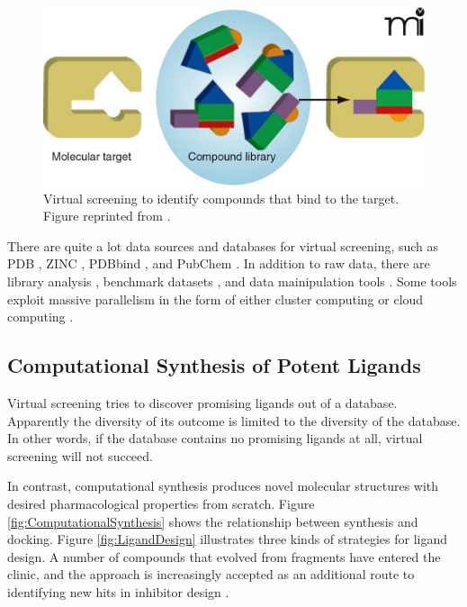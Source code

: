 \begin{figure}
\centering
\includegraphics[width=\textwidth]{Figures/VirtualScreening.png}
\caption{Virtual screening to identify compounds that bind to the target. Figure reprinted from \citep{470}.}
\label{fig:VirtualScreening}
\end{figure}

There are quite a lot data sources and databases for virtual screening, such as PDB \citep{540,539,537,105,538}, ZINC \citep{532}, PDBbind \citep{529,530}, and PubChem \citep{526}. In addition to raw data, there are library analysis \citep{521}, benchmark datasets \citep{534,533,535,536}, and data mainipulation tools \citep{542}. Some tools exploit massive parallelism in the form of either cluster computing or cloud computing \citep{557,773,560,782}.

\subsection{Computational Synthesis of Potent Ligands}

Virtual screening tries to discover promising ligands out of a database. Apparently the diversity of its outcome is limited to the diversity of the database. In other words, if the database contains no promising ligands at all, virtual screening will not succeed.

In contrast, computational synthesis produces novel molecular structures with desired pharmacological properties from scratch. Figure \ref{fig:ComputationalSynthesis} shows the relationship between synthesis and docking. Figure \ref{fig:LigandDesign} \citep{363} illustrates three kinds of strategies for ligand design. A number of compounds that evolved from fragments have entered the clinic, and the approach is increasingly accepted as an additional route to identifying new hits in inhibitor design \citep{363,470}.


